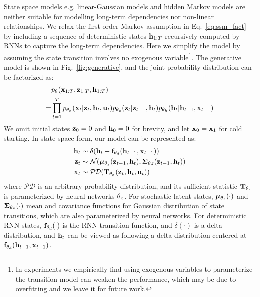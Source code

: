 \documentclass{article}
\begin{document}
State space models e.g. linear-Gaussian models and hidden Markov models are neither suitable for modelling long-term dependencies nor non-linear relationships. We relax the first-order Markov assumption in Eq.~\ref{eq:ssm_fact} by including a sequence of deterministic states $\bh_{1:T}$ recursively computed by RNNs to capture the long-term dependencies. Here we simplify the model by assuming the state transition involves no exogenous variable\footnote{In experiments we empirically find using exogenous variables to parameterize the transition model can weaken the performance, which may be due to overfitting and we leave it for future work.}. The generative model is shown in Fig.~\ref{fig:generative}, and the joint probability distribution can be factorized as:
\begin{equation}\label{eq:joint}
\begin{split}
    &\pT(\bx_{1:T}, \bz_{1:T}, \bh_{1:T})\\
    =&\prod_{t=1}^{T}\pT[x](\bx_t|\bz_t,\bh_t,\bu_t)\pT[z](\bz_t|\bz_{t-1},\bh_t)\pT[h](\bh_t|\bh_{t-1},\bx_{t-1})
\end{split}
\end{equation}
We omit initial states $\bz_0=0$ and $\bh_0 = 0$ for brevity, and let $\bx_0 = \bx_1$ for cold starting. In state space form, our model can be represented as:
\begin{align}
    \bh_t&\sim\delta(\bh_{t}-\mathbf{f}_{\bt[d]}(\bh_{t-1},\bx_{t-1}))\label{eq:recurrent}\\
    \bz_t&\sim\mcN(\bmu_{\bt[z]}(\bz_{t-1},\bh_t),\bm{\Sigma}_{\bt{z}}(\bz_{t-1},\bh_t))\label{eq:transition}\\
    \bx_t&\sim\mathcal{PD}(\mathbf{T}_{\bt[x]}(\bz_{t},\bh_t, \bu_t))\label{eq:emission}
\end{align}
where $\mathcal{PD}$ is an arbitrary probability distribution, and its sufficient statistic $\mathbf{T}_{\bt[x]}$ is parameterized by neural networks $\bt[x]$. For stochastic latent states, $\bmu_{\bt[z]}(\cdot)$ and $\bm{\Sigma}_{\bt{z}}(\cdot)$ mean and covariance functions for Gaussian distribution of state transitions, which are also parameterized by neural networks. For deterministic RNN states, $\mathbf{f}_{\bt[d]}(\cdot)$ is the RNN transition function, and $\delta(\cdot)$ is a delta distribution, and  $\bh_t$ can be viewed as following a delta distribution centered at $\mathbf{f}_{\bt[d]}(\bh_{t-1},\bx_{t-1})$.
\end{document}

